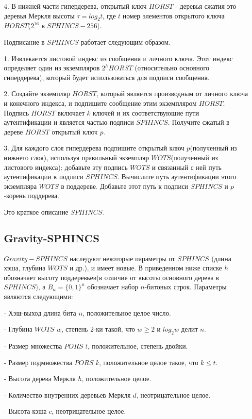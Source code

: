 \documentclass[a4paper, 14pt]{extarticle}
\begin{document}
4. В нижней части гипердерева, открытый ключ $HORST$ - деревья сжатия это деревья Меркля высоты $\tau = log_{2}t$, где $t$ номер элементов открытого ключа $HORST$($2^{16}$ в $SPHINCS-256$).

Подписание в $SPHINCS$ работает следующим образом.

1. Извлекается листовой индекс из сообщения и личного ключа. Этот индекс определяет один из экземпляров $2^{h} HORST$ (относительно основного гипердерева), который будет использоваться для подписи сообщения.

2. Создайте экземпляр $HORST$, который является производным от личного ключа и конечного индекса, и подпишите сообщение этим экземпляром $HORST$. Подпись $HORST$ включает $k$ ключей и их соответствующие пути аутентификации и является частью подписи $SPHINCS$. Получите сжатый в дереве $HORST$ открытый ключ $p$.

3. Для каждого слоя гипердерева подпишите открытый ключ $p$(полученный из нижнего слоя), используя правильный экземпляр $WOTS$(полученный из листового индекса); добавьте эту подпись $WOTS$ и связанный с ней путь аутентификации к подписи $SPHINCS$. Вычислите путь аутентификации этого экземпляра $WOTS$ в поддереве. Добавьте этот путь к подписи $SPHINCS$ и $p$-корень поддерева.

Это краткое описание $SPHINCS$.
\subsection{Gravity-SPHINCS}
$Gravity-SPHINCS$ наследуют некоторые параметры от $SPHINCS$ (длина хэша, глубина $WOTS$ и др.), и имеет новые. В приведенном ниже списке $h$ обозначает высоту поддеревьев(в отличие от высоты основного дерева в $SPHINCS$), а $B_{n} = \{0,1\}^{n}$ обозначает набор $n$-битовых строк. Параметры являются следующими:

- Хэш-выход длина бита $n$, положительное целое число.

- Глубина $WOTS$ $w$, степень 2-ки такой, что $w \geq 2$ и $log_{2}w$ делит $n$.

- Размер множества $PORS$ $t$, положительное, степень двойки.

- Размер подмножества $PORS$ $k$, положительное целое такое, что $k \leq t$.

- Высота дерева Меркля $h$, положительное целое.

- Количество внутренних деревьев Меркля $d$, неотрицательное целое.

- Высота кэша $c$, неотрицательное целое.
\end{document}
